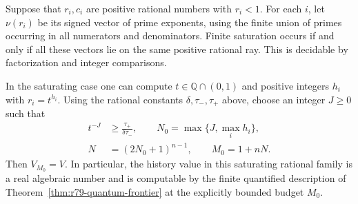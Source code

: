 \begin{corollary}
\label{cor:r80-finite-search-effective}
Suppose that $r_i,c_i$ are positive rational numbers with $r_i<1$.
For each $i$, let $\nu(r_i)$ be its signed vector of prime exponents,
using the finite union of primes occurring in all numerators and
denominators.  Finite saturation occurs if and only if all these
vectors lie on the same positive rational ray.  This is decidable
by factorization and integer comparisons.

In the saturating case one can compute $t\in\mathbb Q\cap(0,1)$
and positive integers $h_i$ with $r_i=t^{h_i}$.  Using the rational
constants $\delta,\tau_-,\tau_+$ above, choose an integer $J\ge0$
such that
\[
 \begin{aligned}
 t^{-J}&\ge\frac{\tau_+}{\delta\tau_-},
 \qquad N_0=\max\{J,\max_i h_i\},\\
 N&=(2N_0+1)^{n-1},\qquad M_0=1+nN.
 \end{aligned}
\]
Then $V_{M_0}=V$.  In particular, the history value in this
saturating rational family is a real algebraic number and is
computable by the finite quantified description of
Theorem~\ref{thm:r79-quantum-frontier} at the explicitly bounded
budget $M_0$.
\end{corollary}
